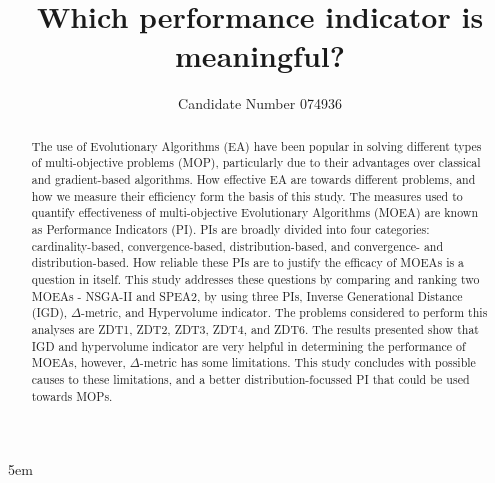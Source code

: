 \documentclass[sigconf, nonacm, preprint]{acmart}
\begin{document}
\title{Which performance indicator is meaningful?}
\author{Candidate Number 074936}

\emergencystretch 5em
\begin{abstract}
	The use of Evolutionary Algorithms (EA) have been popular in solving different types of multi-objective problems (MOP), particularly due to their advantages over classical and gradient-based algorithms. How effective EA are towards different problems, and how we measure their efficiency form the basis of this study. The measures used to quantify effectiveness of multi-objective Evolutionary Algorithms (MOEA) are known as Performance Indicators (PI). PIs are broadly divided into four categories: cardinality-based, convergence-based, distribution-based, and convergence- and distribution-based. How reliable these PIs are to justify the efficacy of MOEAs is a question in itself. This study addresses these questions by comparing and ranking two MOEAs - NSGA-II and SPEA2, by using three PIs, Inverse Generational Distance (IGD), $\Delta$-metric, and Hypervolume indicator. The problems considered to perform this analyses are ZDT1, ZDT2, ZDT3, ZDT4, and ZDT6. The results presented show that IGD and hypervolume indicator are very helpful in determining the performance of MOEAs, however, $\Delta$-metric has some limitations. This study concludes with possible causes to these limitations, and a better distribution-focussed PI that could be used towards MOPs.
\end{abstract}

\maketitle
\end{document}
